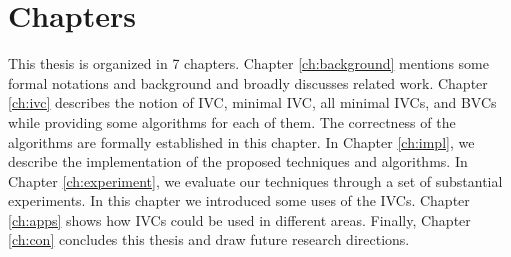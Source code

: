 %
%
%


\section{Chapters}
This thesis is organized in 7 chapters. Chapter \ref{ch:background} mentions some formal notations and background and broadly discusses related work. Chapter \ref{ch:ivc} describes the notion of IVC, minimal IVC, all minimal IVCs, and BVCs while providing some algorithms for each of them. The correctness of the algorithms are formally established in this chapter.
In Chapter \ref{ch:impl}, we describe the implementation of the proposed techniques and algorithms.  In Chapter \ref{ch:experiment}, we evaluate our techniques through a set of substantial experiments.
In this chapter we introduced some uses of the IVCs. Chapter \ref{ch:apps} shows how IVCs could be used in different areas. Finally, Chapter \ref{ch:con} concludes this thesis and draw future research directions.

